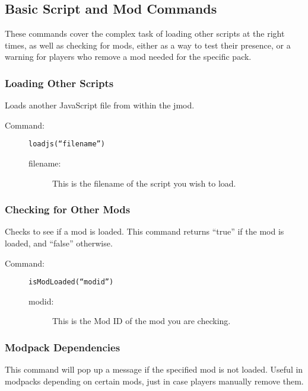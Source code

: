 \documentclass[letterpaper,titlepage,12pt]{article}
\begin{document}
\subsection{Basic Script and Mod Commands}

These commands cover the complex task of loading other scripts at the right times, as well as checking for mods, either as a way to test their presence, or a warning for players who remove a mod needed for the specific pack.

\subsubsection{Loading Other Scripts}

Loads another JavaScript file from within the jmod.

\begin{description}
\item[Command:] \texttt{loadjs(``\emph{filename}'')}
\begin{description}
\item [filename:] This is the filename of the script you wish to load.
\end{description}
\end{description}


\subsubsection{Checking for Other Mods}

Checks to see if a mod is loaded.  This command returns ``true'' if the mod is loaded, and ``false'' otherwise.

\begin{description}
\item[Command:] \texttt{isModLoaded(``\emph{modid}'')}

\begin{description}
\item [modid:] This is the Mod ID of the mod you are checking.
\end{description}
\end{description}

\subsubsection{Modpack Dependencies}

This command will pop up a message if the specified mod is not loaded.  Useful in modpacks depending on certain mods, just in case players manually remove them.
\end{document}
